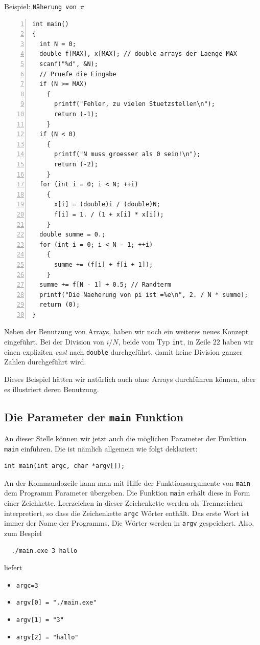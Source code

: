 \begin{myexampleprogram}{Beispiel: \texttt{Näherung von $\pi$}}
\begin{lstlisting}[numbers=left]
int main()
{
  int N = 0;
  double f[MAX], x[MAX]; // double arrays der Laenge MAX
  scanf("%d", &N);
  // Pruefe die Eingabe
  if (N >= MAX)
    {
      printf("Fehler, zu vielen Stuetzstellen\n");
      return (-1);
    }
  if (N < 0)
    {
      printf("N muss groesser als 0 sein!\n");
      return (-2);
    }
  for (int i = 0; i < N; ++i)
    {
      x[i] = (double)i / (double)N;
      f[i] = 1. / (1 + x[i] * x[i]);
    }
  double summe = 0.;
  for (int i = 0; i < N - 1; ++i)
    {
      summe += (f[i] + f[i + 1]);
    }
  summe += f[N - 1] + 0.5; // Randterm
  printf("Die Naeherung von pi ist =%e\n", 2. / N * summe);
  return (0);
}
\end{lstlisting}
  Neben der Benutzung von Arrays, haben wir noch ein weiteres neues Konzept eingeführt.
  Bei der Division von $i/N$, beide vom Typ \verb|int|, in Zeile $22$ haben wir einen expliziten \emph{cast} nach \verb|double| durchgeführt, damit keine Division ganzer Zahlen durchgeführt wird.

  Dieses Beispiel hätten wir natürlich auch ohne Arrays durchführen können, aber es illustriert deren Benutzung.
\end{myexampleprogram}

\subsection{Die Parameter der \texttt{main} Funktion}

An dieser Stelle können wir jetzt auch die möglichen Parameter der Funktion \verb|main| einführen.
Die ist nämlich allgemein wie folgt deklariert:
\begin{lstlisting}
int main(int argc, char *argv[]);
\end{lstlisting}
An der Kommandozeile kann man mit Hilfe der Funktionsargumente von \verb|main| dem Programm Parameter übergeben.
Die Funktion \verb|main| erhält diese in Form einer Zeichkette.
Leerzeichen in dieser Zeichenkette werden als Trennzeichen interpretiert, so dass die Zeichenkette \verb|argc| Wörter enthält.
Das erste Wort ist immer der Name der Programms.
Die Wörter werden in \verb|argv| gespeichert.
Also, zum Bespiel
\begin{verbatim}
  ./main.exe 3 hallo
\end{verbatim}
liefert 
\begin{itemize}
\item \verb|argc=3|
\item \verb|argv[0] = "./main.exe"|
\item \verb|argv[1] = "3"|
\item \verb|argv[2] = "hallo"|
\end{itemize}

